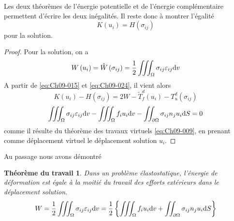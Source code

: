Les deux théorèmes de l'énergie potentielle et de l'énergie complémentaire permettent d'écrire les deux inégalités.
Il reste donc à montrer l'égalité 
\begin{equation}
    K\left( u_i \right) = H\left( \sigma_{ij} \right)
    \label{eq:Ch09-030}
\end{equation}
pour la solution. 
\begin{proof}
    Pour la solution, on a 
    \begin{displaymath}
        W\left( u_i \right) = \hat{W} \left( \sigma_{ij} \right) = \frac{1}{2} \iiint_{\Omega} \sigma_{ij} \varepsilon_{ij} \mathrm{d} v
    \end{displaymath}
    A partir de \eqref{eq:Ch09-015} et \eqref{eq:Ch09-024}, il vient alors
    \begin{displaymath}
        K\left( u_i \right) - H \left( \sigma_{ij} \right) = 2W - \tilde{T}_f^d \left( u_i \right) - T_u^d \left( \sigma_{ij} \right)
    \end{displaymath}
    \begin{displaymath}
        \iiint_{\Omega} \sigma_{ij} \varepsilon_{ij} \mathrm{d} v - \iiint_{\Omega} f_i u_i \mathrm{d} v - \iint_{\partial \Omega} \sigma_{ij} n_j u_i \mathrm{d} S = 0
    \end{displaymath}
    comme il résulte du théorème des travaux virtuels \eqref{eq:Ch09-009}, en prenant comme déplacement virtuel le déplacement solution $u_i$.
\end{proof}

Au passage nous avons démontré
\newtheorem*{ThTra}{Théorème du travail}
\begin{ThTra}
    Dans un problème élastostatique, l'énergie de déformation est égale à la moitié du travail des efforts extérieurs dans le déplacement solution.
    \begin{equation}
        W = \frac{1}{2} \iiint_{\Omega} \sigma_{ij} \varepsilon_{ij} \mathrm{d} v = \frac{1}{2} \left\{ \iiint_{\Omega} f_i u_i \mathrm{d} v + \iint_{\partial \Omega} \sigma_{ij} n_j u_i \mathrm{d} S \right\}
        \label{eq:Ch09-031}
    \end{equation}
\end{ThTra}

